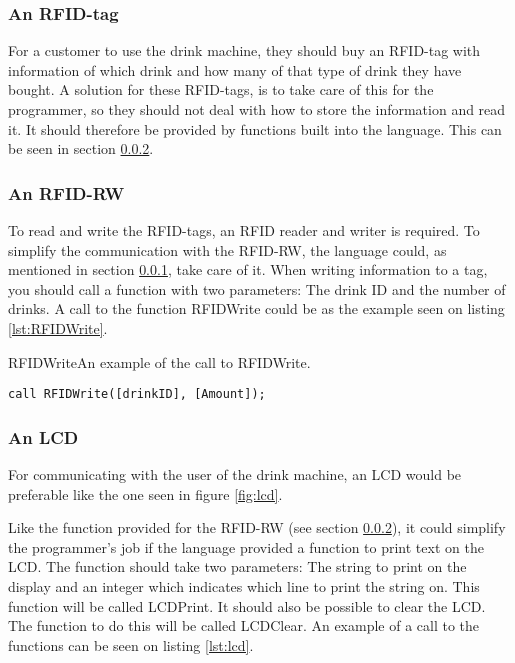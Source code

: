 \subsubsection{An RFID-tag}
\label{sec:RFIDtag}
For a customer to use the drink machine, they should buy an RFID-tag with information of which drink and how many of that type of drink they have bought. A solution for these RFID-tags, is to take care of this for the programmer, so they should not deal with how to store the information and read it. It should therefore be provided by functions built into the language. This can be seen in section \ref{sec:RFIDRW}.

\subsubsection{An RFID-RW}
\label{sec:RFIDRW}
To read and write the RFID-tags, an RFID reader and writer is required. To simplify the communication with the RFID-RW, the language could, as mentioned in section \ref{sec:RFIDtag}, take care of it. When writing information to a tag, you should call a function with two parameters: The drink ID and the number of drinks. A call to the function RFIDWrite could be as the example seen on listing \ref{lst:RFIDWrite}.

\begin{code}{RFIDWrite}{An example of the call to RFIDWrite.}
\begin{lstlisting}[mathescape]
call RFIDWrite([drinkID], [Amount]);
\end{lstlisting}
\end{code}

\subsubsection{An LCD}
For communicating with the user of the drink machine, an LCD would be preferable like the one seen in figure \ref{fig:lcd}.


Like the function provided for the RFID-RW (see section \ref{sec:RFIDRW}), it could simplify the programmer's job if the language provided a function to print text on the LCD. The function should take two parameters: The string to print on the display and an integer which indicates which line to print the string on. This function will be called LCDPrint. It should also be possible to clear the LCD. The function to do this will be called LCDClear. An example of a call to the functions can be seen on listing \ref{lst:lcd}.

